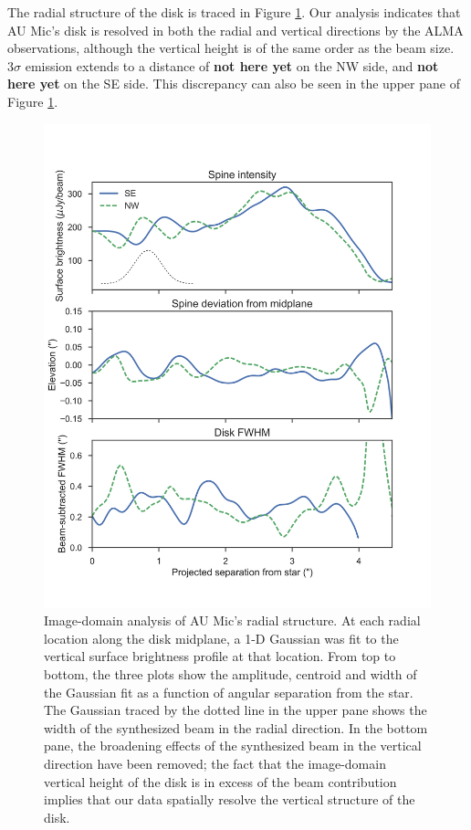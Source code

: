 \documentclass[12pt,oneside]{book}
\begin{document}
The radial structure of the disk is traced in Figure \ref{fig: boccaletti}. 
Our analysis indicates that AU Mic's disk is resolved in both the radial and vertical directions by the ALMA observations, although the vertical height is of the same order as the beam size. 
$3\sigma$ emission extends to a distance of \textbf{not here yet} on the NW side, and \textbf{not here yet} on the SE side. 
This discrepancy can also be seen in the upper pane of Figure \ref{fig: boccaletti}. 

\begin{figure}
  \centering
  \includegraphics[width=.75\linewidth]{figures/3_boccaletti_plots}
  \caption{
  Image-domain analysis of AU Mic's radial structure. 
  At each radial location along the disk midplane, a 1-D Gaussian was fit to the vertical surface brightness profile at that location.
  From top to bottom, the three plots show the amplitude, centroid and width of the Gaussian fit as a function of angular separation from the star. 
  The Gaussian traced by the dotted line in the upper pane shows the width of the  synthesized beam in the radial direction.
  In the bottom pane, the broadening effects of the synthesized beam in the vertical direction have been removed; the fact that the image-domain vertical height of the disk is in excess of the beam contribution implies that our data spatially resolve the vertical structure of the disk.} 
  \label{fig: boccaletti}
\end{figure}
\end{document}
